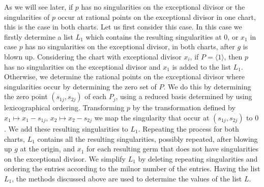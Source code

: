 \documentclass[noend]{amsproc}
\begin{document}
As we will see later, if $p$ has no singularities on the exceptional divisor or the
singularities of $p$ occur at rational points on the exceptional divisor in one
chart, this is the case in both charts. Let us first consider this case.
In this case we firstly determine a list $L_1$ which contains the resulting
singularities at $0$, or $x_1$ in case $p$ has no singularities on the exceptional divisor, 
in both charts, after $g$ is blown up. Considering the chart with
exceptional divisor $x_i$, if $P=\langle 1\rangle$, then $p$ has no singularities on the
exceptional divisor and $x_1$ is added to the list $L_1$. Otherwise, we determine the
rational points on the exceptional divisor where singularities occur by
determining the zero set of $P$. We do this by determining the zero point
$(s_{1j},s_{2j})$ of each $P_j$, using a reduced basis determined by using
lexicographical ordering. Transforming $p$ by the transformation defined by
$x_1\mapsto x_1-s_{1j}$, $x_2\mapsto x_2-s_{2j}$ we map the singularity that
occur at  $(s_{1j},s_{2j})$ to $0$. We add these resulting singularities to
$L_1$. Repeating the process for both charts, $L_1$ contains all the resulting
singularities, possibly repeated, after blowing up $g$ at the origin, and $x_1$
for each resulting germ that does not have singularities on the exceptional divisor. We
simplify $L_1$ by deleting repeating singularities and ordering the entries
according to the milnor number of the entries. Having the list $L_1$, the
methods discussed above are used to determine the values of the list $L$.
\end{document}
